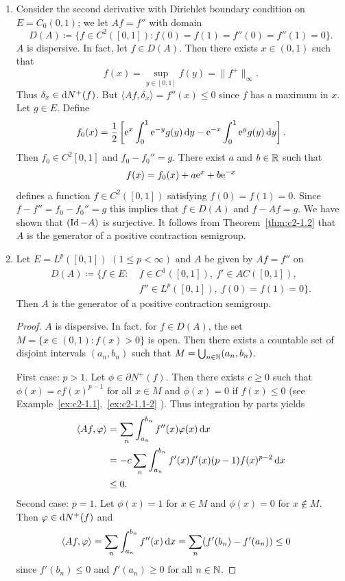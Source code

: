 \begin{examples}\label{ex:c2-1.5}
%
\begin{enumerate}[\upshape (i), wide, labelindent=.25em] %
\item \label{ex:c2-1.5-1}
Consider the second derivative with Dirichlet boundary condition on $E = C_{0}(0,1)$; \ie we let $Af = f''$ with domain 
\[
D(A) \coloneq \{f \in C^{2}([0,1]) \colon f(0) = f(1) = f''(0) = f''(1) = 0\} .
\]
$A$ is dispersive. 
In fact, let $f \in D(A)$. 
Then there exists $x \in (0,1)$ such that 
\[
f(x) = \sup_{y \in [0,1]} f(y) = \|f^{+}\|_{\infty}.
\]
Thus $\delta_{x} \in \mathop{}\!\mathrm{d}{N^{+}}(f)$. 
But $\langle Af,\delta_{x} \rangle = f''(x) \leq 0$ since $f$ has a maximum in $x$.
Let $g \in E$. 
Define 
\[
f_{0}(x) = \frac{1}{2} \left[\mathrm{e}^{x} \int_{0}^{1} \mathrm{e}^{-y}g(y) \mathop{}\!\mathrm{d}{y} - \mathrm{e}^{-x} \int_{0}^{1} \mathrm{e}^{y}g(y) \mathop{}\!\mathrm{d}{y} \right].
\]
Then $f_{0} \in C^{2}[0,1]$ and $f_{0} - f_{0}'' = g$. 
There exist $a$ and $ b \in \mathbb{R}$ such that 
%
\[
	f(x) = f_{0}(x) + a\mathrm{e}^{x} + b\mathrm{e}^{-x}
\]
%
defines a function $f \in C^{2}([0,1])$ satisfying $f(0) = f(1) = 0$. Since $f - f'' = f_{0} - f_{0}'' = g$ this implies that $f \in D(A)$ and $f - Af = g$. We have shown that $(\operatorname{Id} - A)$ is surjective. It follows from 
Theorem~\ref{thm:c2-1.2} that $A$ is the generator of a positive contraction semigroup.
\item \label{ex:c2-1.5-2}
Let $E = L^{p}([0,1])$ $(1 \leq p < \infty)$ and $A$ be given by $Af = f''$ on 
\begin{align*}
D(A) \coloneqq \{f \in E \colon\ &f \in C^{1}([0,1]),\ f' \in AC([0,1]), \\
    &f'' \in L^{p}([0,1]),\ f(0) = f(1) = 0\}.
\end{align*}
Then $A$ is the generator of a positive contraction semigroup.
\begin{proof}
$A$ is dispersive. 
In fact, for $f \in D(A)$, the set $M = \{x \in (0,1) \colon f(x) > 0\}$ is open. Then there exists a countable set of disjoint intervals $(a_{n},b_{n})$ such that $M = \bigcup_{n \in \mathbb{N}} (a_{n},b_{n})$.

First case: $p > 1$.
Let $\phi \in \partial N^{+}(f)$. 
Then there exists $c \geq 0$ such that $\phi(x) = c f(x)^{p-1}$ for all $x \in M$ and $\phi(x) = 0$ if\/ $f(x) \leq 0$ (see Example~\ref{ex:c2-1.1},~\ref{ex:c2-1.1-2} ). 
Thus integration by parts yields
\begin{align*}
\langle Af,\phi \rangle &= \sum_{n} \int_{a_{n}}^{b_{n}} f''(x)\phi(x) \dx \\
&= -c \sum_{n} \int_{a_{n}}^{b_{n}} f'(x)f'(x) (p-1)f(x)^{p-2}  \dx \\
&\leq 0.
\end{align*}
Second case: $p = 1$.
Let $\phi(x) = 1$ for $x \in M$ and $\phi(x) = 0$ for $x \not\in M$. 
Then $\phi \in \diff{N^{+}}(f)$ and
\begin{align*}
\langle Af,\phi \rangle &= \sum_{n} \int_{a_{n}}^{b_{n}} f''(x) \dx = \sum_{n} (f'(b_{n}) - f'(a_{n})) \leq 0
\end{align*}
since $f'(b_{n}) \leq 0$ and $f'(a_{n}) \geq 0$ for all $n \in \mathbb{N}$.


\end{proof}
\end{enumerate}
\end{examples}

